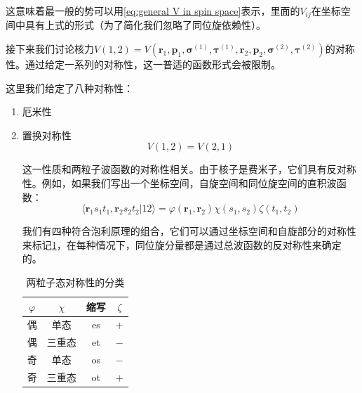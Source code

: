 这意味着最一般的势可以用\ref{eq:general V in spin space}表示，里面的$V_{ij}$在坐标空间中具有上式的形式（为了简化我们忽略了同位旋依赖性）。

接下来我们讨论核力$V(1,2)=V(\boldsymbol{r}_{1},\boldsymbol{p}_{1},\boldsymbol{\sigma}^{(1)},\boldsymbol{\tau}^{(1)},\boldsymbol{r}_{2},\boldsymbol{p}_{2},\boldsymbol{\sigma}^{(2)},\boldsymbol{\tau}^{(2)})$的对称性。通过给定一系列的对称性，这一普适的函数形式会被限制。

这里我们给定了八种对称性：
\begin{enumerate}
\item 厄米性
\item 置换对称性
\[
V(1,2)=V(2,1)
\]

这一性质和两粒子波函数的对称性相关。由于核子是费米子，它们具有反对称性。例如，如果我们写出一个坐标空间，自旋空间和同位旋空间的直积波函数：
\[
\langle\boldsymbol{r}_{1}s_{1}t_{1},\boldsymbol{r}_{2}s_{2}t_{2}|12\rangle=\varphi(\boldsymbol{r}_{1},\boldsymbol{r}_{2})\chi(s_{1},s_{2})\zeta(t_{1},t_{2})
\]

我们有四种符合泡利原理的组合，它们可以通过坐标空间和自旋部分的对称性来标记\ref{tab:=004E24=007C92=005B50=006001=005BF9=0079F0=006027=007684=005206=007C7B}，在每种情况下，同位旋分量都是通过总波函数的反对称性来确定的。
\begin{table}[H]
\begin{centering}
\caption{\label{tab:=004E24=007C92=005B50=006001=005BF9=0079F0=006027=007684=005206=007C7B}两粒子态对称性的分类}
\par\end{centering}
\centering{}%
\begin{tabular}{|c|c|c|c|}
\hline 
$\varphi$ & $\chi$ & 缩写 & $\zeta$\tabularnewline
\hline 
\hline 
偶 & 单态 & es & $+$\tabularnewline
\hline 
偶 & 三重态 & et & $-$\tabularnewline
\hline 
奇 & 单态 & os & $-$\tabularnewline
\hline 
奇 & 三重态 & ot & $+$\tabularnewline
\hline 
\end{tabular}
\end{table}


\end{enumerate}
